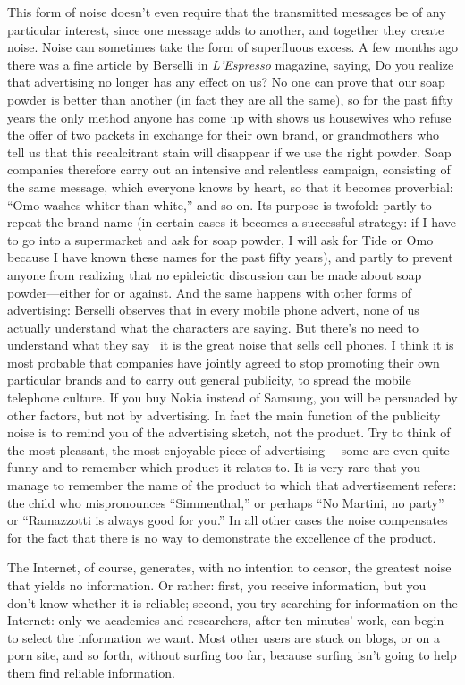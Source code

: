 \documentclass[11pt,twocolumn]{article}
\begin{document}
This form of noise doesn't even require that the transmitted messages
be of any particular interest, since one message adds to another,
and together they create noise. Noise can sometimes take the form
of superfluous excess. A few months ago there was a fine article
by Berselli in \emph{L'Espresso} magazine, saying, Do you realize that
advertising no longer has any effect on us? No one can prove that
our soap powder is better than another (in fact they are all the
same), so for the past fifty years the only method anyone has come
up with shows us housewives who refuse the offer of two packets in
exchange for their own brand, or grandmothers who tell us that this
recalcitrant stain will disappear if we use the right powder. Soap
companies therefore carry out an intensive and relentless campaign,
consisting of the same message, which everyone knows by heart, so
that it becomes proverbial: ``Omo washes whiter than white,'' and so
on. Its purpose is twofold: partly to repeat the brand name (in
certain cases it becomes a successful strategy: if I have to go
into a supermarket and ask for soap powder, I will ask for Tide or
Omo because I have known these names for the past fifty years), and
partly to prevent anyone from realizing that no epideictic discussion
can be made about soap powder---either for or against. And the
same happens with other forms of advertising: Berselli observes
that in every mobile phone advert, none of us actually understand
what the characters are saying. But there's no need to understand
what they say~ it is the great noise that sells cell phones. I think
it is most probable that companies have jointly agreed to stop
promoting their own particular brands and to carry out general
publicity, to spread the mobile telephone culture. If you buy Nokia
instead of Samsung, you will be persuaded by other factors, but not
by advertising. In fact the main function of the publicity noise
is to remind you of the advertising sketch, not the product. Try
to think of the most pleasant, the most enjoyable piece of advertising---
some are even quite funny and to remember which product it relates
to. It is very rare that you manage to remember the name of the
product to which that advertisement refers: the child who mispronounces
``Simmenthal,'' or perhaps ``No Martini, no party'' or ``Ramazzotti is
always good for you.'' In all other cases the noise compensates for
the fact that there is no way to demonstrate the excellence of the
product.

The Internet, of course, generates, with no intention
to censor, the greatest noise that yields no information. Or rather:
first, you receive information, but you don't know whether it is
reliable; second, you try searching for information on the Internet:
only we academics and researchers, after ten minutes' work, can
begin to select the information we want. Most other users are stuck
on blogs, or on a porn site, and so forth, without surfing too far,
because surfing isn't going to help them find reliable information.
\end{document}
